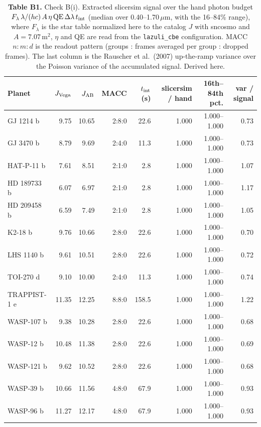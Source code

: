 \begin{table}[H]
\centering\small
\begin{tabular}{@{}lrrrrrrr@{}}
\toprule
\textbf{Planet} & \textbf{$J_{\rm Vega}$} & \textbf{$J_{\rm AB}$} & \textbf{MACC} & \textbf{$t_{\rm int}$ (s)} & \textbf{slicersim / hand} & \textbf{16th--84th pct.} & \textbf{var / signal} \\
\midrule
GJ 1214 b & 9.75 & 10.65 & 2:8:0 & 22.6 & 1.000 & 1.000--1.000 & 0.73 \\
GJ 3470 b & 8.79 & 9.69 & 2:4:0 & 11.3 & 1.000 & 1.000--1.000 & 0.73 \\
HAT-P-11 b & 7.61 & 8.51 & 2:1:0 & 2.8 & 1.000 & 1.000--1.000 & 1.07 \\
HD 189733 b & 6.07 & 6.97 & 2:1:0 & 2.8 & 1.000 & 1.000--1.000 & 1.17 \\
HD 209458 b & 6.59 & 7.49 & 2:1:0 & 2.8 & 1.000 & 1.000--1.000 & 1.05 \\
K2-18 b & 9.76 & 10.66 & 2:8:0 & 22.6 & 1.000 & 1.000--1.000 & 0.70 \\
LHS 1140 b & 9.61 & 10.51 & 2:8:0 & 22.6 & 1.000 & 1.000--1.000 & 0.72 \\
TOI-270 d & 9.10 & 10.00 & 2:4:0 & 11.3 & 1.000 & 1.000--1.000 & 0.74 \\
TRAPPIST-1 e & 11.35 & 12.25 & 8:8:0 & 158.5 & 1.000 & 1.000--1.000 & 1.22 \\
WASP-107 b & 9.38 & 10.28 & 2:8:0 & 22.6 & 1.000 & 1.000--1.000 & 0.68 \\
WASP-12 b & 10.48 & 11.38 & 2:8:0 & 22.6 & 1.000 & 1.000--1.000 & 0.69 \\
WASP-121 b & 9.62 & 10.52 & 2:8:0 & 22.6 & 1.000 & 1.000--1.000 & 0.68 \\
WASP-39 b & 10.66 & 11.56 & 4:8:0 & 67.9 & 1.000 & 1.000--1.000 & 0.93 \\
WASP-96 b & 11.27 & 12.17 & 4:8:0 & 67.9 & 1.000 & 1.000--1.000 & 0.93 \\
\bottomrule
\end{tabular}
\caption*{\footnotesize\textbf{Table B1.} Check B(i). Extracted slicersim signal over the hand photon budget $F_\lambda\,\lambda/(hc)\,A\,\eta\,{\rm QE}\,\Delta\lambda\,t_{\rm int}$ (median over 0.40--1.70\,$\mu$m, with the 16--84\% range), where $F_\lambda$ is the star table normalized here to the catalog $J$ with sncosmo and $A=7.07$\,m$^2$, $\eta$ and QE are read from the \texttt{lazuli\_cbe} configuration. MACC $n{:}m{:}d$ is the readout pattern (groups : frames averaged per group : dropped frames). The last column is the Rauscher et al.\ (2007) up-the-ramp variance over the Poisson variance of the accumulated signal. Derived here.}
\end{table}
